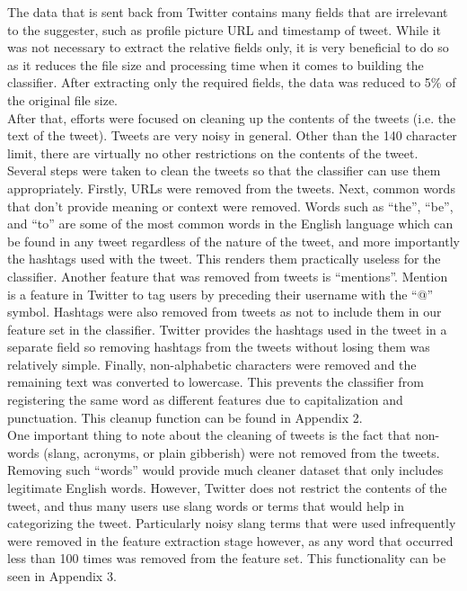 \documentclass[conference]{IEEEtran}
\begin{document}
The data that is sent back from Twitter contains many fields that are irrelevant to the suggester, such as profile picture URL and timestamp of tweet. While it was not necessary to extract the relative fields only, it is very beneficial to do so as it reduces the file size and processing time when it comes to building the classifier. After extracting only the required fields, the data was reduced to 5\% of the original file size. \\

After that, efforts were focused on cleaning up the contents of the tweets (i.e. the text of the tweet). Tweets are very noisy in general. Other than the 140 character limit, there are virtually no other restrictions on the contents of the tweet. Several steps were taken to clean the tweets so that the classifier can use them appropriately. Firstly, URLs were removed from the tweets. Next, common words that don’t provide meaning or context were removed. Words such as ``the'', ``be'', and ``to'' are some of the most common words in the English language which can be found in any tweet regardless of the nature of the tweet, and more importantly the hashtags used with the tweet. This renders them practically useless for the classifier. Another feature that was removed from tweets is ``mentions''. Mention is a feature in Twitter to tag users by preceding their username with the ``@'' symbol. Hashtags were also removed from tweets as not to include them in our feature set in the classifier. Twitter provides the hashtags used in the tweet in a separate field so removing hashtags from the tweets without losing them was relatively simple. Finally, non-alphabetic characters were removed and the remaining text was converted to lowercase. This prevents the classifier from registering the same word as different features due to capitalization and punctuation. This cleanup function can be found in Appendix 2. \\

One important thing to note about the cleaning of tweets is the fact that non-words (slang, acronyms, or plain gibberish) were not removed from the tweets. Removing such ``words'' would provide much cleaner dataset that only includes legitimate English words. However, Twitter does not restrict the contents of the tweet, and thus many users use slang words or terms that would help in categorizing the tweet. Particularly noisy slang terms that were used infrequently were removed in the feature extraction stage however, as any word that occurred less than 100 times was removed from the feature set. This functionality can be seen in Appendix 3.\\
\end{document}
